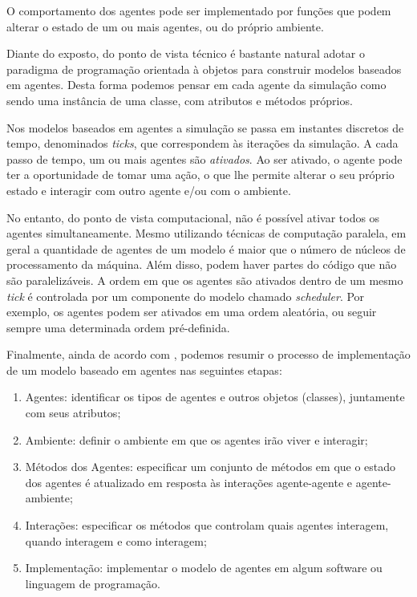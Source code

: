 \documentclass[preprint,12pt]{elsarticle}
\begin{document}
O comportamento dos agentes pode ser implementado por funções que podem alterar o estado de um ou mais agentes, ou do próprio ambiente.

Diante do exposto, do ponto de vista técnico é bastante natural adotar o paradigma de programação orientada à objetos para construir modelos baseados em agentes. Desta forma podemos pensar em cada agente da simulação como sendo uma instância de uma classe, com atributos e métodos próprios. 

Nos modelos baseados em agentes a simulação se passa em instantes discretos de tempo, denominados \textit{ticks}, que correspondem às iterações da simulação. A cada passo de tempo, um ou mais agentes são \textit{ativados}. Ao ser ativado, o agente pode ter a oportunidade de tomar uma ação, o que lhe permite alterar o seu próprio estado e interagir com outro agente e/ou com o ambiente.

No entanto, do ponto de vista computacional, não é possível ativar todos os agentes simultaneamente. Mesmo utilizando técnicas de computação paralela, em geral a quantidade de agentes de um modelo é maior que o número de núcleos de processamento da máquina. Além disso, podem haver partes do código que não são paralelizáveis. A ordem em que os agentes são ativados dentro de um mesmo \textit{tick} é controlada por um componente do modelo chamado \textit{scheduler}. Por exemplo, os agentes podem ser ativados em uma ordem aleatória, ou seguir sempre uma determinada ordem pré-definida.

Finalmente, ainda de acordo com \cite{macal2005tutorial}, podemos resumir o processo de implementação de um modelo baseado em agentes nas seguintes etapas:

\begin{enumerate}
	\item Agentes: identificar os tipos de agentes e outros objetos (classes), juntamente com seus atributos;
	\item Ambiente: definir o ambiente em que os agentes irão viver e interagir;
	\item Métodos dos Agentes: especificar um conjunto de métodos em que o estado dos agentes é atualizado em resposta às interações agente-agente e agente-ambiente;
	\item Interações: especificar os métodos que controlam quais agentes interagem, quando interagem e como interagem;
	\item Implementação: implementar o modelo de agentes em algum software ou linguagem de programação.
\end{enumerate}
\end{document}
